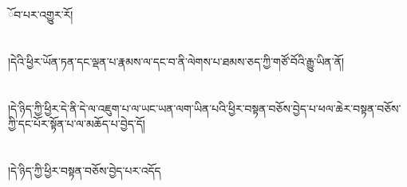ོབ་པར་འགྱུར་རོ།\chapter{ }།དེའི་ཕྱིར་ཡོན་ཏན་དང་ལྡན་པ་རྣམས་ལ་དང་བ་ནི་ལེགས་པ་ཐམས་ཅད་ཀྱི་གཙོ་བོའི་རྒྱུ་ཡིན་ནོ།\chapter{ }།དེ་ཉིད་ཀྱི་ཕྱིར་དེ་ནི་དེ་ལ་འཇུག་པ་ལ་ཡང་ཡན་ལག་ཡིན་པའི་ཕྱིར་བསྟན་བཅོས་བྱེད་པ་ཕལ་ཆེར་བསྟན་བཅོས་ཀྱི་དང་པོར་སྟོན་པ་ལ་མཆོད་པ་བྱེད་དོ།\chapter{ }།དེ་ཉིད་ཀྱི་ཕྱིར་བསྟན་བཅོས་བྱེད་པར་འདོད